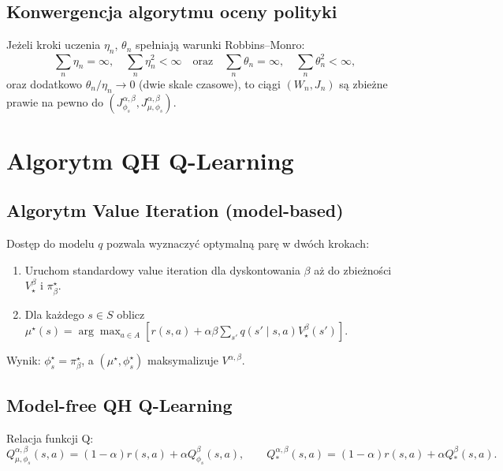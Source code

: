 \subsection{Konwergencja algorytmu oceny polityki}

\begin{theorem}
\label{thm:policy-eval-conv}
Jeżeli kroki uczenia $\eta_n$, $\theta_n$ spełniają warunki Robbins--Monro:
\[
\sum_n \eta_n = \infty, \quad \sum_n \eta_n^2 < \infty \quad \text{oraz} \quad \sum_n \theta_n = \infty, \quad \sum_n \theta_n^2 < \infty,
\]
oraz dodatkowo $\theta_n / \eta_n \to 0$ (dwie skale czasowe), to ciągi $(W_n, J_n)$ są zbieżne prawie na pewno do $(J^{\alpha, \beta}_{\phi_s}, J^{\alpha, \beta}_{\mu, \phi_s})$.
\end{theorem}

\section{Algorytm QH Q-Learning}

\subsection{Algorytm Value Iteration (model-based)}

Dostęp do modelu $q$ pozwala wyznaczyć optymalną parę w dwóch krokach:
\begin{enumerate}
\item Uruchom standardowy value iteration dla dyskontowania $\beta$ aż do zbieżności $V^{\beta}_\star$ i $\pi^\star_\beta$.
\item Dla każdego $s \in S$ oblicz $\mu^\star(s) = \arg\max_{a \in A} \left[ r(s, a) + \alpha \beta \sum_{s'} q(s'\mid s, a) V^{\beta}_\star(s') \right]$.
\end{enumerate}
Wynik: $\phi_s^\star = \pi^\star_\beta$, a $(\mu^\star, \phi_s^\star)$ maksymalizuje $V^{\alpha, \beta}$.

\subsection{Model-free QH Q-Learning}

Relacja funkcji Q:
\begin{equation}
Q^{\alpha, \beta}_{\mu, \phi_s}(s,a) = (1 - \alpha) r(s,a) + \alpha Q^{\beta}_{\phi_s}(s,a), \qquad Q^{\alpha, \beta}_*(s,a) = (1 - \alpha) r(s,a) + \alpha Q^{\beta}_*(s,a).
\label{eq:q-relation}
\end{equation}


